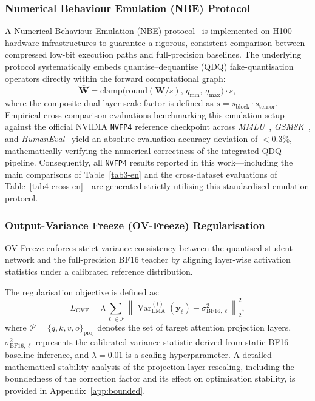 \documentclass[a4paper,fleqn]{cas-sc}
\begin{document}
\subsubsection{Numerical Behaviour Emulation (NBE) Protocol}\label{sec:nbe}

A Numerical Behaviour Emulation (NBE) protocol~\citep{NVIDIA2024TRTLLMReleaseNotes,NVIDIA2024TensorRTLLMDocs} is implemented on H100 hardware infrastructures to guarantee a rigorous, consistent comparison between compressed low-bit execution paths and full-precision baselines. The underlying protocol systematically embeds quantise--dequantise (QDQ) fake-quantisation operators directly within the forward computational graph:
\begin{equation}
\label{eq:nbe}
\widehat{\bm{W}} = \text{clamp}\!\bigl(\text{round}(\bm{W}/s),\,q_{\min},\,q_{\max}\bigr) \cdot s,
\end{equation}
where the composite dual-layer scale factor is defined as $s = s_{\text{block}} \cdot s_{\text{tensor}}$. Empirical cross-comparison evaluations benchmarking this emulation setup against the official NVIDIA \texttt{NVFP4} reference checkpoint across \textit{MMLU}~\citep{30}, \textit{GSM8K}~\citep{31}, and \textit{HumanEval}~\citep{32} yield an absolute evaluation accuracy deviation of $< 0.3\%$, mathematically verifying the numerical correctness of the integrated QDQ pipeline. Consequently, all \texttt{NVFP4} results reported in this work---including the main comparisons of Table~\ref{tab3-en} and the cross-dataset evaluations of Table~\ref{tab4-cross-en}---are generated strictly utilising this standardised emulation protocol.

\subsubsection{Output-Variance Freeze (OV-Freeze) Regularisation}\label{sec:ovfreeze-method}

OV-Freeze enforces strict variance consistency between the quantised student network and the full-precision BF16 teacher by aligning layer-wise activation statistics under a calibrated reference distribution.

The regularisation objective is defined as:
\begin{equation}
\label{eq:ovf-loss}
L_{\mathrm{OVF}} = \lambda \sum_{\ell \in \mathcal{P}} \left\| \operatorname{Var}^{(t)}_{\mathrm{EMA}}(\bm{y}_\ell) - \sigma^2_{\mathrm{BF16},\ell} \right\|_2^2,
\end{equation}
where $\mathcal{P} = \{q, k, v, o\}_{\text{proj}}$ denotes the set of target attention projection layers, $\sigma^2_{\mathrm{BF16},\ell}$ represents the calibrated variance statistic derived from static BF16 baseline inference, and $\lambda = 0.01$ is a scaling hyperparameter. A detailed mathematical stability analysis of the projection-layer rescaling, including the boundedness of the correction factor and its effect on optimisation stability, is provided in Appendix~\ref{app:bounded}.
\end{document}
